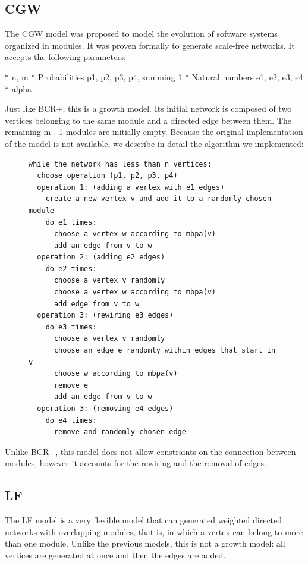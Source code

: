 \subsection{CGW}

The CGW model was proposed to model the evolution of software systems organized in
modules. It was proven formally to generate scale-free networks. \cite{Chen2008}
It accepts the following parameters:

* n, m
* Probabilities p1, p2, p3, p4, summing 1
* Natural numbers e1, e2, e3, e4
* alpha

Just like BCR+, this is a growth model. Its initial network is composed of two
vertices belonging to the same module and a directed edge between them. The
remaining m - 1 modules are initially empty. Because the original implementation
of the model is not available, we describe in detail the algorithm we
implemented:

\begin{figure}
\begin{verbatim}
while the network has less than n vertices:
  choose operation (p1, p2, p3, p4)
  operation 1: (adding a vertex with e1 edges)
    create a new vertex v and add it to a randomly chosen module
    do e1 times:
      choose a vertex w according to mbpa(v)
      add an edge from v to w
  operation 2: (adding e2 edges)
    do e2 times:
      choose a vertex v randomly
      choose a vertex w according to mbpa(v)
      add edge from v to w
  operation 3: (rewiring e3 edges)
    do e3 times:
      choose a vertex v randomly
      choose an edge e randomly within edges that start in v
      choose w according to mbpa(v)
      remove e
      add an edge from v to w
  operation 3: (removing e4 edges)
    do e4 times:
      remove and randomly chosen edge
\end{verbatim}
\end{figure}

Unlike BCR+, this model does not allow constraints on the connection between
modules, however it accounts for the rewiring and the removal of edges. 

\subsection{LF}

The LF model is a very flexible model that can generated weighted directed
networks with overlapping modules, that is, in which a vertex can belong to more
than one module. Unlike the previous models, this is not a growth model: all
vertices are generated at once and then the edges are added.

